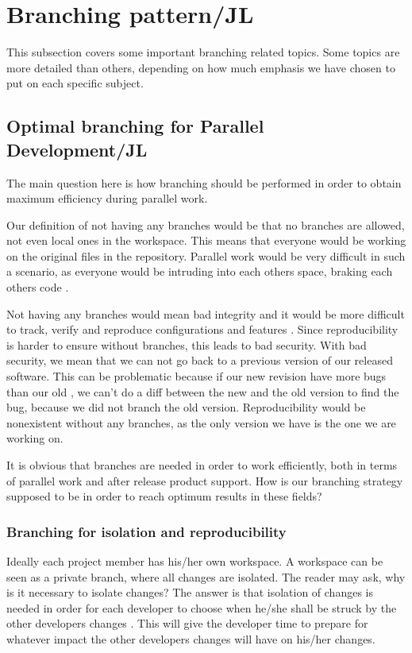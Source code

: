 \documentclass[10pt]{article}
\begin{document}
\section{Branching pattern/JL}
This subsection covers some important branching related topics. Some topics are more detailed than others, depending on how much emphasis we have chosen to put on each specific subject.

\subsection{Optimal branching for Parallel Development/JL}
The main question here is how branching should be performed in order to obtain maximum efficiency during parallel work.

\noindent Our definition of not having any branches would be that no branches are allowed, not even local ones in the workspace. This means that everyone would be working on the original files in the repository. Parallel work would be very difficult in such a scenario, as everyone would be intruding into each others space, braking each others code \cite{Appleton}.

\noindent Not having any branches would mean bad integrity and it would be more difficult to track, verify and reproduce configurations and features \cite{Appleton}. Since reproducibility is harder to ensure without branches, this leads to bad security. With bad security, we mean that we can not go back to a previous version of our released software. This can be problematic because if our new revision have more bugs than our old \cite{Babich}, we can't do a diff between the new and the old version to find the bug, because we did not branch the old version. Reproducibility would be nonexistent without any branches, as the only version we have is the one we are working on.

\noindent It is obvious that branches are needed in order to work efficiently, both in terms of parallel work and after release product support. How is our branching strategy supposed to be in order to reach optimum results in these fields?

\subsubsection{Branching for isolation and reproducibility}
\noindent Ideally each project member has his/her own workspace. A workspace can be seen as a private branch, where all changes are isolated. The reader may ask, why is it necessary to isolate changes? The answer is that isolation of changes is needed in order for each developer to choose when he/she shall be struck by the other developers changes \cite{Appleton}. This will give the developer time to prepare for whatever impact the other developers changes will have on his/her changes.
\end{document}

